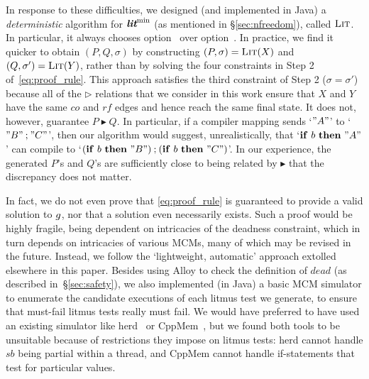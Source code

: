 In response to these difficulties, we designed (and implemented in
Java) a \emph{deterministic} algorithm for $\textbf{\itshape lit}^{\rm min}$ (as mentioned in
\S\ref{sec:nfreedom}), called $\textsc{Lit}$. In particular, it always
chooses option~ over
option~. In practice, we find it quicker to
obtain $(P,Q,\sigma)$ by constructing $(P,\sigma) = \textsc{Lit}(X)$ and
$(Q,\sigma') = \textsc{Lit}(Y)$, rather than by solving the four
constraints in Step 2 of~\eqref{eq:proof_rule}. This approach
satisfies the third constraint of Step 2 ($\sigma = \sigma'$) because
all of the $\triangleright$ relations that we consider in this work
ensure that $X$ and $Y$ have the same $co$ and $rf$ edges and hence
reach the same final state. It does not, however, guarantee
$P\blacktriangleright Q$. In particular, if a compiler mapping sends
`$"A"$' to `$"B"\mathbin{;}"C"$', then our algorithm would suggest,
unrealistically, that `$\mathbf{if}~b~\mathbf{then}~"A"$' can compile
to
`$(\mathbf{if}~b~\mathbf{then}~"B")\mathbin{;}
(\mathbf{if}~b~\mathbf{then}~"C")$'.  In our experience, the generated
$P$'s and $Q$'s are sufficiently close to being related by
$\blacktriangleright$ that the discrepancy does not matter.

In fact, we do not even prove that \eqref{eq:proof_rule} is guaranteed
to provide a valid solution to $g$, nor that a solution
even necessarily exists. Such a proof would be highly fragile, being
dependent on intricacies of the deadness constraint, which in turn
depends on intricacies of various MCMs, many of which may be revised
in the future. Instead, we follow the `lightweight, automatic'
approach extolled elsewhere in this paper. Besides using Alloy to
check the definition of $dead$ (as described in~\S\ref{sec:safety}),
we also implemented (in Java) a basic MCM simulator to enumerate the
candidate executions of each litmus test we generate, to ensure that
must-fail litmus tests really must fail. We would have preferred to
have used an existing simulator like \textsf{herd}~\cite{alglave+14}
or CppMem~\cite{batty+11}, but we found both tools to be unsuitable
because of restrictions they impose on litmus tests:
\textsf{herd} cannot handle $sb$ being partial within a thread, and
CppMem cannot handle if-statements that test for particular values.




